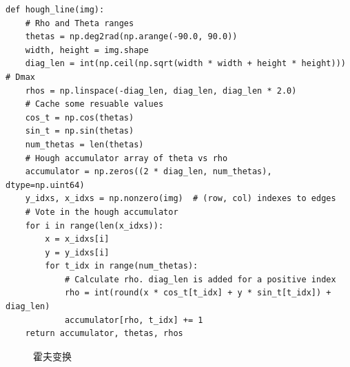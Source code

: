 \documentclass{article}
\begin{document}
\begin{lstlisting}[title={hough transform}]
def hough_line(img):
    # Rho and Theta ranges
    thetas = np.deg2rad(np.arange(-90.0, 90.0))
    width, height = img.shape
    diag_len = int(np.ceil(np.sqrt(width * width + height * height)))   # Dmax
    rhos = np.linspace(-diag_len, diag_len, diag_len * 2.0)
    # Cache some resuable values
    cos_t = np.cos(thetas)
    sin_t = np.sin(thetas)
    num_thetas = len(thetas)
    # Hough accumulator array of theta vs rho
    accumulator = np.zeros((2 * diag_len, num_thetas), dtype=np.uint64)
    y_idxs, x_idxs = np.nonzero(img)  # (row, col) indexes to edges
    # Vote in the hough accumulator
    for i in range(len(x_idxs)):
        x = x_idxs[i]
        y = y_idxs[i]
        for t_idx in range(num_thetas):
            # Calculate rho. diag_len is added for a positive index
            rho = int(round(x * cos_t[t_idx] + y * sin_t[t_idx]) + diag_len)
            accumulator[rho, t_idx] += 1
    return accumulator, thetas, rhos
\end{lstlisting}

\begin{figure}[ht]
	\centering
	\quad
	\caption{霍夫变换}
	\label{fig:data}
\end{figure}
\end{document}
